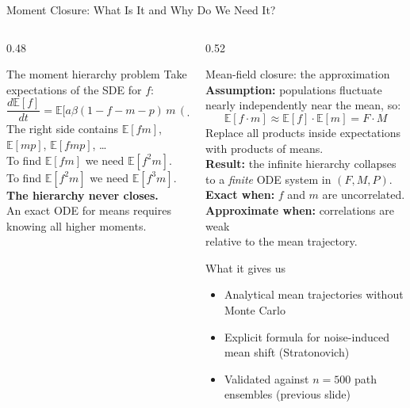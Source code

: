 \documentclass{beamer}
\newcommand{\E}{\mathbb{E}}
\begin{document}
\begin{frame}{Moment Closure: What Is It and Why Do We Need It?}
  \tiny

  \begin{columns}[T]

    \begin{column}{0.48\textwidth}
      \begin{block}{The moment hierarchy problem}
        Take expectations of the SDE for $f$:
        \[
          \frac{d\E[f]}{dt} = \E\bigl[a\beta(1-f-m-p)\,m\,(f-\gamma p)\bigr]
        \]
        The right side contains $\E[fm]$, $\E[mp]$, $\E[fmp]$, \ldots\\[6pt]
        To find $\E[fm]$ we need $\E[f^2m]$.\\
        To find $\E[f^2m]$ we need $\E[f^3m]$.\\[6pt]
        \textcolor{alertred}{\textbf{The hierarchy never closes.}}\\[4pt]
        An exact ODE for means requires\\
        knowing all higher moments.
      \end{block}
    \end{column}

    \begin{column}{0.52\textwidth}
      \begin{block}{Mean-field closure: the approximation}
        \textbf{Assumption:} populations fluctuate\\
        nearly independently near the mean, so:
        \[
          \E[f \cdot m] \approx \E[f]\cdot\E[m] = F \cdot M
        \]
        Replace all products inside expectations\\
        with products of means.\\[6pt]
        \textbf{Result:} the infinite hierarchy collapses\\
        to a \emph{finite} ODE system in $(F, M, P)$.\\[6pt]
        \textbf{Exact when:} $f$ and $m$ are uncorrelated.\\
        \textbf{Approximate when:} correlations are weak\\
        relative to the mean trajectory.
      \end{block}

      \vspace{0.2cm}
      \begin{block}{What it gives us}
        \begin{itemize}
          \item Analytical mean trajectories without Monte Carlo
          \item Explicit formula for noise-induced mean shift (Stratonovich)
          \item Validated against $n=500$ path ensembles (previous slide)
        \end{itemize}
      \end{block}
    \end{column}


\end{columns}
\end{frame}
\end{document}

